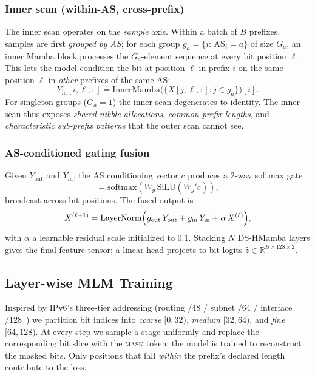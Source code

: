 \documentclass[conference]{IEEEtran}
\begin{document}
\subsubsection{Inner scan (within-AS, cross-prefix)}
The inner scan operates on the \emph{sample} axis.  Within a batch of
$B$ prefixes, samples are first \emph{grouped by AS}; for each group
$g_a=\{i:\,\mathrm{AS}_i=a\}$ of size $G_a$, an inner Mamba block
processes the $G_a$-element sequence at every bit position $\ell$.
This lets the model condition the bit at position $\ell$ in prefix $i$
on the same position $\ell$ in \emph{other} prefixes of the same AS:
\begin{equation}
  Y_{\mathrm{in}}[i,\ell,:]
   = \mathrm{InnerMamba}\bigl(\{X[j,\ell,:]:j\in g_a\}\bigr)[i].
\end{equation}
For singleton groups ($G_a=1$) the inner scan degenerates to identity.
The inner scan thus exposes \emph{shared nibble allocations},
\emph{common prefix lengths}, and \emph{characteristic sub-prefix
patterns} that the outer scan cannot see.

\subsubsection{AS-conditioned gating fusion}
Given $Y_{\mathrm{out}}$ and $Y_{\mathrm{in}}$, the AS conditioning
vector $c$ produces a 2-way softmax gate
\begin{equation}
  [g_{\mathrm{out}},g_{\mathrm{in}}]
   = \mathrm{softmax}(W_{g}\,\mathrm{SiLU}(W_g' c)),
\end{equation}
broadcast across bit positions.  The fused output is
\begin{equation}
  X^{(\ell+1)} = \mathrm{LayerNorm}\Bigl(
     g_{\mathrm{out}}\,Y_{\mathrm{out}}
    +g_{\mathrm{in}}\,Y_{\mathrm{in}}
    +\alpha\,X^{(\ell)}\Bigr),
\end{equation}
with $\alpha$ a learnable residual scale initialized to $0.1$.  Stacking
$N$ DS-HMamba layers gives the final feature tensor; a linear head
projects to bit logits $\hat z\in\mathbb{R}^{B\times 128\times 2}$.

\subsection{Layer-wise MLM Training}\label{sec:design-train}
Inspired by IPv6's three-tier addressing (routing /48 / subnet /64 /
interface /128~\cite{rfc4291}) we partition bit indices into
\emph{coarse} $[0,32)$, \emph{medium} $[32,64)$, and \emph{fine}
$[64,128)$.  At every step we sample a stage uniformly and replace the
corresponding bit slice with the \textsc{mask} token; the model is
trained to reconstruct the masked bits.  Only positions that fall
\emph{within} the prefix's declared length contribute to the loss.
\end{document}
